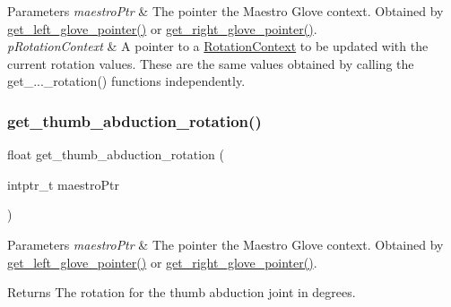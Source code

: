 \begin{DoxyParams}{Parameters}
{\em maestro\+Ptr} & The pointer the Maestro Glove context. Obtained by \hyperlink{group__glove_management_ga63ce3c99d4a8b8db851b22af9185764e}{get\+\_\+left\+\_\+glove\+\_\+pointer()} or \hyperlink{group__glove_management_ga9b8fd9d91aeac3f8da50f7a7eba0c32b}{get\+\_\+right\+\_\+glove\+\_\+pointer()}. \\
\hline
{\em p\+Rotation\+Context} & A pointer to a {\ttfamily \hyperlink{struct_rotation_context}{Rotation\+Context}} to be updated with the current rotation values. These are the same values obtained by calling the {\ttfamily get\+\_\+...\+\_\+rotation()} functions independently. \\
\hline
\end{DoxyParams}
\mbox{\label{group__rotation_access_ga2dddb1473cdf463238904595e309938f}} 
\subsubsection{\texorpdfstring{get\+\_\+thumb\+\_\+abduction\+\_\+rotation()}{get\_thumb\_abduction\_rotation()}}
{\footnotesize\ttfamily float get\+\_\+thumb\+\_\+abduction\+\_\+rotation (\begin{DoxyParamCaption}\item[{intptr\+\_\+t}]{maestro\+Ptr }\end{DoxyParamCaption})}


\begin{DoxyParams}{Parameters}
{\em maestro\+Ptr} & The pointer the Maestro Glove context. Obtained by \hyperlink{group__glove_management_ga63ce3c99d4a8b8db851b22af9185764e}{get\+\_\+left\+\_\+glove\+\_\+pointer()} or \hyperlink{group__glove_management_ga9b8fd9d91aeac3f8da50f7a7eba0c32b}{get\+\_\+right\+\_\+glove\+\_\+pointer()}. \\
\hline
\end{DoxyParams}
\begin{DoxyReturn}{Returns}
The rotation for the thumb abduction joint in degrees. 
\end{DoxyReturn}
\mbox{\label{group__rotation_access_ga47f787dada77cf7f4f39ebf245aec420}} 

